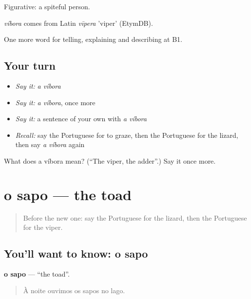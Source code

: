 Figurative: a spiteful person.

\begin{cousinweb}
\emph{víbora} comes from Latin \emph{vīpera} 'viper' (EtymDB).
\end{cousinweb}

\begin{grammarlens}[title={What you've built}]
One more word for telling, explaining and describing at B1.
\end{grammarlens}

\subsection*{Your turn}
\begin{itemize}
\raggedright
  \item \emph{Say it:} \emph{a víbora}
  \item \emph{Say it:} \emph{a víbora}, once more
  \item \emph{Say it:} a sentence of your own with \emph{a víbora}
  \item \emph{Recall:} say the Portuguese for to graze, then the Portuguese for the lizard, then say \emph{a víbora} again
\end{itemize}

\begin{tcolorbox}[breakable,colback=teal!4,colframe=teal!35!black,title={Before you move on}]
What does a víbora mean? (\textquotedblleft{}The viper, the adder\textquotedblright{}.) Say it once more.
\end{tcolorbox}
\section[o sapo]{o sapo — the toad}

\label{lesson:PT-C461-sapo}



\begin{quote}
Before the new one: say the Portuguese for the lizard, then the Portuguese for the viper.
\end{quote}

\subsection*{You'll want to know: o sapo}
\textbf{o sapo} — \textquotedblleft{}the toad\textquotedblright{}.

\begin{quote}
À noite ouvimos os sapos no lago.
\end{quote}

